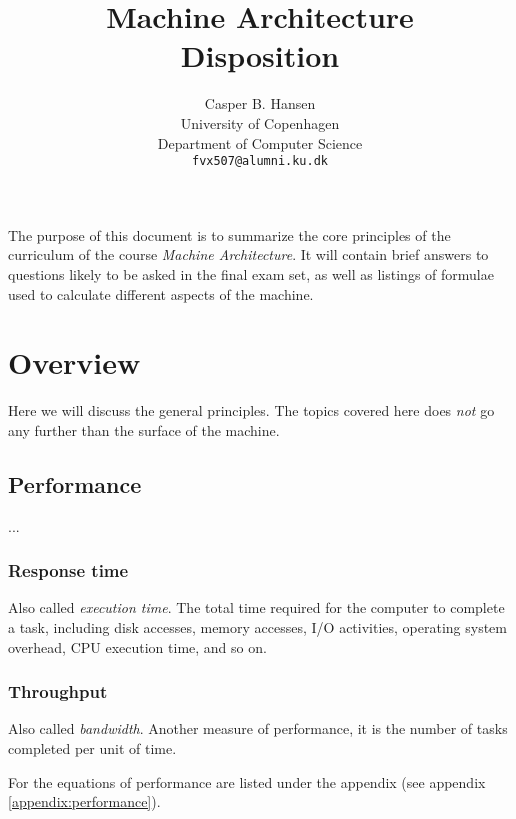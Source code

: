 \documentclass[11pt,a4paper]{article}
\title
{
	{\large Machine Architecture} \\
	Disposition	
}
\author
{
	Casper B. Hansen \\
	University of Copenhagen \\
	Department of Computer Science \\
	{\tt fvx507@alumni.ku.dk}
}
\newcommand{\appendixref}[1]{(see appendix \ref{#1})}
\begin{document}
\clearpage\maketitle\thispagestyle{empty}
\begin{multicols}{2}
\abstract
{
	\noindent
	The purpose of this document is to summarize the core principles of the
	curriculum of the course {\it Machine Architecture}. It will contain brief
	answers to questions likely to be asked in the final exam set, as well as
	listings of formulae used to calculate different aspects of the machine.
}
\vfill
\columnbreak
\tableofcontents
\end{multicols}

\newpage
\section{Overview}
Here we will discuss the general principles. The topics covered here does
{\it not} go any further than the surface of the machine.

\subsection{Performance}
...

\begin{multicols}{2}
\subsubsection{Response time}
Also called {\it execution time}. The total time required for the computer to
complete a task, including disk accesses, memory accesses, I/O activities,
operating system overhead, CPU execution time, and so on.
\vfill
\columnbreak
\subsubsection{Throughput}
Also called {\it bandwidth}. Another measure of performance, it is the number
of tasks completed per unit of time.
\end{multicols}
For the equations of performance are listed under the appendix
\appendixref{appendix:performance}. 


\end{document}
